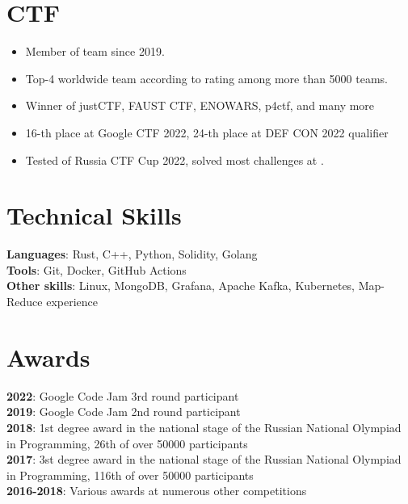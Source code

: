 \documentclass[letterpaper,11pt]{article}
\begin{document}
\section {CTF}
\begin{itemize}[leftmargin=0.15in]
  \setlength\itemsep{-5px}
  \item Member of \href{https://ctftime.org/team/83435}{\color{blue}{C4T BuT S4D}} team since 2019.
  \item Top-4 worldwide team according to \href{https://ctftime.org}{\color{blue}{ctftime}} rating among more than 5000 teams.
  \item Winner of justCTF, FAUST CTF, ENOWARS, p4ctf, and many more
  \item 16-th place at Google CTF 2022, 24-th place at DEF CON 2022 qualifier
  \item Tested \href{https://github.com/C4T-BuT-S4D/ctfcup-2022-stage3-part1}{\color{blue}{solidity stage}} of Russia CTF Cup 2022, solved most challenges at \href{https://capturetheether.com/challenges/}{\color{blue}{Capture the Ether}}.
\end{itemize}

\section{Technical Skills}
 \begin{itemize}[leftmargin=0.15in, label={}]
    \small{\item{
     \textbf{Languages}{: Rust, C++, Python, Solidity, Golang} \\
     \textbf{Tools}{: Git, Docker, GitHub Actions} \\
     \textbf{Other skills}{: Linux, MongoDB, Grafana, Apache Kafka, Kubernetes, Map-Reduce experience}
    }}
 \end{itemize}

\section{Awards}
 \begin{itemize}[leftmargin=0.15in, label={}]
    \small{\item{
    \textbf{2022}{: Google Code Jam 3rd round participant} \\
    \textbf{2019}{: Google Code Jam 2nd round participant} \\
    \textbf{2018}{: 1st degree award in the national stage of the Russian National Olympiad in Programming, 26th of over 50000 participants} \\
    \textbf{2017}{: 3st degree award in the national stage of the Russian National Olympiad in Programming, 116th of over 50000 participants} \\
    \textbf{2016-2018}{: Various awards at numerous other competitions} \\
    }}
 \end{itemize}


\end{document}
